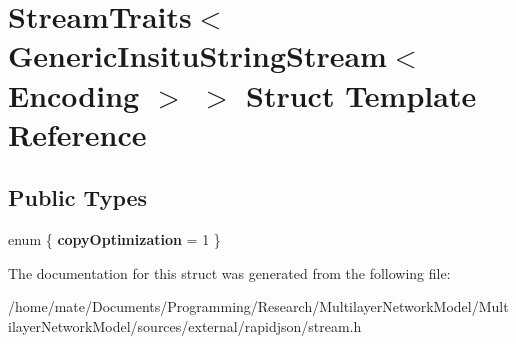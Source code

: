 \hypertarget{structStreamTraits_3_01GenericInsituStringStream_3_01Encoding_01_4_01_4}{}\section{Stream\+Traits$<$ Generic\+Insitu\+String\+Stream$<$ Encoding $>$ $>$ Struct Template Reference}
\label{structStreamTraits_3_01GenericInsituStringStream_3_01Encoding_01_4_01_4}
\subsection*{Public Types}
\begin{DoxyCompactItemize}
\item 
enum \{ {\bfseries copy\+Optimization} = 1
 \}\hypertarget{structStreamTraits_3_01GenericInsituStringStream_3_01Encoding_01_4_01_4_a67a610522828f475093e1e3c3b51a793}{}\label{structStreamTraits_3_01GenericInsituStringStream_3_01Encoding_01_4_01_4_a67a610522828f475093e1e3c3b51a793}

\end{DoxyCompactItemize}


The documentation for this struct was generated from the following file\+:\begin{DoxyCompactItemize}
\item 
/home/mate/\+Documents/\+Programming/\+Research/\+Multilayer\+Network\+Model/\+Multilayer\+Network\+Model/sources/external/rapidjson/stream.\+h\end{DoxyCompactItemize}

